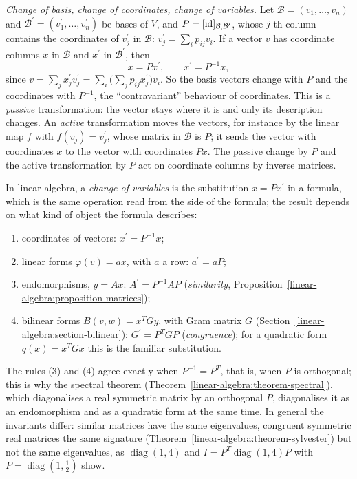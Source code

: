 \begin{remark}\label{linear-algebra:remark-change-of-coordinates}
\emph{Change of basis, change of coordinates, change of variables.} Let $\mathcal{B} = (v_1, \ldots, v_n)$ and $\mathcal{B}^{\prime} = (v_1^{\prime}, \ldots, v_n^{\prime})$ be bases of $V$, and
$P = [\mathrm{id}]_{\mathcal{B}, \mathcal{B}^{\prime}}$, whose $j$-th column contains the coordinates of $v_j^{\prime}$ in $\mathcal{B}$: $v_j^{\prime} = \sum_ip_{ij}v_i$. If a vector $v$ has coordinate
columns $x$ in $\mathcal{B}$ and $x^{\prime}$ in $\mathcal{B}^{\prime}$, then
\[
x = Px^{\prime}, \qquad x^{\prime} = P^{-1}x,
\]
since $v = \sum_jx_j^{\prime}v_j^{\prime} = \sum_i\bigl(\sum_jp_{ij}x_j^{\prime}\bigr)v_i$. So the basis vectors change with $P$ and the coordinates with $P^{-1}$, the ``contravariant'' behaviour of
coordinates. This is a \emph{passive} transformation: the vector stays where it is and only its description changes. An \emph{active} transformation moves the vectors, for instance by the linear
map $f$ with $f(v_j) = v_j^{\prime}$, whose matrix in $\mathcal{B}$ is $P$; it sends the vector with coordinates $x$ to the vector with coordinates $Px$. The passive change by $P$ and the active
transformation by $P$ act on coordinate columns by inverse matrices.

In linear algebra, a \emph{change of variables} is the substitution $x = Px^{\prime}$ in a formula, which is the same operation read from the side of the formula; the result depends on what kind of
object the formula describes:
\begin{enumerate}
\item coordinates of vectors: $x^{\prime} = P^{-1}x$;
\item linear forms $\varphi(v) = ax$, with $a$ a row: $a^{\prime} = aP$;
\item endomorphisms, $y = Ax$: $A^{\prime} = P^{-1}AP$ (\emph{similarity}, Proposition~\ref{linear-algebra:proposition-matrices});
\item bilinear forms $B(v, w) = x^TGy$, with Gram matrix $G$ (Section~\ref{linear-algebra:section-bilinear}): $G^{\prime} = P^TGP$ (\emph{congruence}); for a quadratic form
$q(x) = x^TGx$ this is the familiar substitution.
\end{enumerate}
The rules (3) and (4) agree exactly when $P^{-1} = P^T$, that is, when $P$ is orthogonal; this is why the spectral theorem (Theorem~\ref{linear-algebra:theorem-spectral}), which diagonalises a real
symmetric matrix by an orthogonal $P$, diagonalises it as an endomorphism and as a quadratic form at the same time. In general the invariants differ: similar matrices have the same eigenvalues,
congruent symmetric real matrices the same signature (Theorem~\ref{linear-algebra:theorem-sylvester}) but not the same eigenvalues, as $\operatorname{diag}(1, 4)$ and
$I = P^T\operatorname{diag}(1, 4)P$ with $P = \operatorname{diag}(1, \frac12)$ show.


\end{remark}
